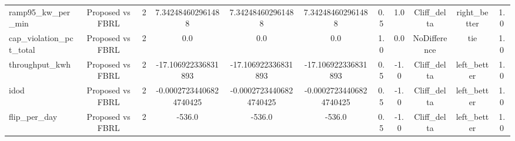 \begin{table}[t]
\begin{tabular}{lcccccccccc}
ramp95\_kw\_per\_min & Proposed vs FBRL & 2 & 7.342484602961488 & 7.342484602961488 & 7.342484602961488 & 0.5 & 1.0 & Cliff\_delta & right\_better & 1.0 \\
cap\_violation\_pct\_total & Proposed vs FBRL & 2 & 0.0 & 0.0 & 0.0 & 1.0 & 0.0 & NoDifference & tie & 1.0 \\
throughput\_kwh & Proposed vs FBRL & 2 & -17.106922336831893 & -17.106922336831893 & -17.106922336831893 & 0.5 & -1.0 & Cliff\_delta & left\_better & 1.0 \\
idod & Proposed vs FBRL & 2 & -0.00027234406824740425 & -0.00027234406824740425 & -0.00027234406824740425 & 0.5 & -1.0 & Cliff\_delta & left\_better & 1.0 \\
flip\_per\_day & Proposed vs FBRL & 2 & -536.0 & -536.0 & -536.0 & 0.5 & -1.0 & Cliff\_delta & left\_better & 1.0 \\
\bottomrule
\end{tabular}
\end{table}